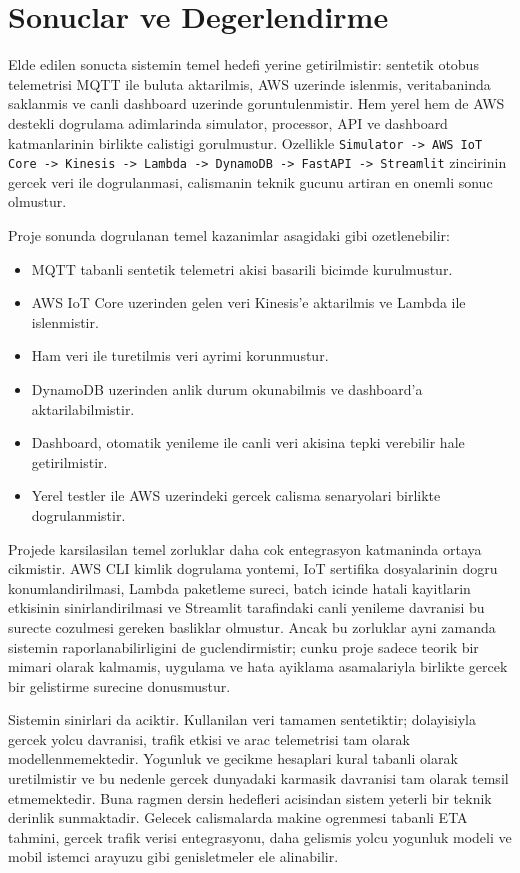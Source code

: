 \section{Sonuclar ve Degerlendirme}

Elde edilen sonucta sistemin temel hedefi yerine getirilmistir: sentetik otobus telemetrisi MQTT ile buluta aktarilmis, AWS uzerinde islenmis, veritabaninda saklanmis ve canli dashboard uzerinde goruntulenmistir. Hem yerel hem de AWS destekli dogrulama adimlarinda simulator, processor, API ve dashboard katmanlarinin birlikte calistigi gorulmustur. Ozellikle \texttt{Simulator -> AWS IoT Core -> Kinesis -> Lambda -> DynamoDB -> FastAPI -> Streamlit} zincirinin gercek veri ile dogrulanmasi, calismanin teknik gucunu artiran en onemli sonuc olmustur.

Proje sonunda dogrulanan temel kazanimlar asagidaki gibi ozetlenebilir:

\begin{itemize}[leftmargin=*]
    \item MQTT tabanli sentetik telemetri akisi basarili bicimde kurulmustur.
    \item AWS IoT Core uzerinden gelen veri Kinesis'e aktarilmis ve Lambda ile islenmistir.
    \item Ham veri ile turetilmis veri ayrimi korunmustur.
    \item DynamoDB uzerinden anlik durum okunabilmis ve dashboard'a aktarilabilmistir.
    \item Dashboard, otomatik yenileme ile canli veri akisina tepki verebilir hale getirilmistir.
    \item Yerel testler ile AWS uzerindeki gercek calisma senaryolari birlikte dogrulanmistir.
\end{itemize}

Projede karsilasilan temel zorluklar daha cok entegrasyon katmaninda ortaya cikmistir. AWS CLI kimlik dogrulama yontemi, IoT sertifika dosyalarinin dogru konumlandirilmasi, Lambda paketleme sureci, batch icinde hatali kayitlarin etkisinin sinirlandirilmasi ve Streamlit tarafindaki canli yenileme davranisi bu surecte cozulmesi gereken basliklar olmustur. Ancak bu zorluklar ayni zamanda sistemin raporlanabilirligini de guclendirmistir; cunku proje sadece teorik bir mimari olarak kalmamis, uygulama ve hata ayiklama asamalariyla birlikte gercek bir gelistirme surecine donusmustur.

Sistemin sinirlari da aciktir. Kullanilan veri tamamen sentetiktir; dolayisiyla gercek yolcu davranisi, trafik etkisi ve arac telemetrisi tam olarak modellenmemektedir. Yogunluk ve gecikme hesaplari kural tabanli olarak uretilmistir ve bu nedenle gercek dunyadaki karmasik davranisi tam olarak temsil etmemektedir. Buna ragmen dersin hedefleri acisindan sistem yeterli bir teknik derinlik sunmaktadir. Gelecek calismalarda makine ogrenmesi tabanli ETA tahmini, gercek trafik verisi entegrasyonu, daha gelismis yolcu yogunluk modeli ve mobil istemci arayuzu gibi genisletmeler ele alinabilir.
